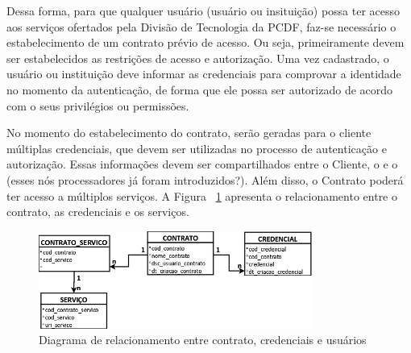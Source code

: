 Dessa forma, para que qualquer usu\'{a}rio {\color{red}(usuário ou insitui\c c\~{a}o)} 
possa ter acesso aos serviços ofertados pela Divisão de Tecnologia da PCDF, 
faz-se necess\'{a}rio o estabelecimento de um contrato prévio de acesso. Ou seja, 
primeiramente devem ser estabelecidos as restri\c c\~{o}es de acesso e autorização. 
Uma vez cadastrado, o {\color{red}usuário ou institui\c c\~{a}o} deve 
informar as credenciais para comprovar a identidade no momento da autenticação, 
de forma que ele possa ser autorizado de acordo com o seus {\color{red}privilégios ou permiss\~{o}es}.

No momento do estabelecimento do contrato, ser\~{a}o geradas 
para o cliente múltiplas credenciais, que devem ser utilizadas no processo de autenticação e 
autorização. Essas informações 
devem ser compartilhados entre o Cliente, o \servidorAA{} e o \servidorRest{} 
({\color{red}esses n\'{o}s processadores j\'{a} foram introduzidos?}). 
Além disso, o Contrato poderá ter acesso a múltiplos serviços. A Figura ~\ref{fig:diagrama_relacionamento} apresenta o relacionamento entre o contrato, as credenciais e os serviços.

\begin{figure}[!htb]
    \centering
    \includegraphics[width=0.8\textwidth]{modelo_relacionamento_contrato1.png}
    \caption{Diagrama de relacionamento entre contrato, credenciais e usuários}
    \label{fig:diagrama_relacionamento}
\end{figure}




